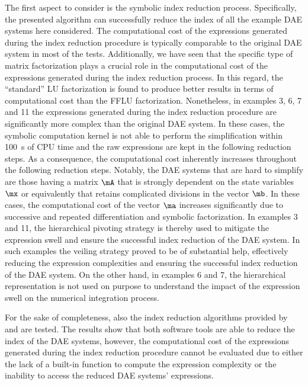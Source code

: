 The first aspect to consider is the symbolic index reduction process. Specifically, the presented algorithm can successfully reduce the index of all the example \ac{DAE} systems here considered. The computational cost of the expressions generated during the index reduction procedure is typically comparable to the original \ac{DAE} system in most of the tests. Additionally, we have seen that the specific type of matrix factorization plays a crucial role in the computational cost of the expressions generated during the index reduction process. In this regard, the ``standard'' \ac{LU} factorization is found to produce better results in terms of computational cost than the \ac{FFLU} factorization. Nonetheless, in examples 3, 6, 7 and 11 the expressions generated during the index reduction procedure are significantly more complex than the original \ac{DAE} system. In these cases, the \Maple{} symbolic computation kernel is not able to perform the simplification within \SI{100}{\second} of \ac{CPU} time and the raw expressions are kept in the following reduction steps. As a consequence, the computational cost inherently increases throughout the following reduction steps. Notably, the \ac{DAE} systems that are hard to simplify are those having a matrix $\mA$ that is strongly dependent on the state variables $\mx$ or equivalently that retains complicated divisions in the vector $\mb$. In these cases, the computational cost of the vector $\ma$ increases significantly due to successive and repeated differentiation and symbolic factorization. In examples 3 and 11, the hierarchical pivoting strategy is thereby used to mitigate the expression swell and ensure the successful index reduction of the \ac{DAE} system. In such examples the veiling strategy proved to be of substantial help, effectively reducing the expression complexities and ensuring the successful index reduction of the \ac{DAE} system. On the other hand, in examples 6 and 7, the hierarchical representation is not used on purpose to understand the impact of the expression swell on the numerical integration process.

For the sake of completeness, also the index reduction algorithms provided by \Matlab{} and \Mathematica{} are tested. The results show that both software tools are able to reduce the index of the \ac{DAE} systems, however, the computational cost of the expressions generated during the index reduction procedure cannot be evaluated due to either the lack of a built-in function to compute the expression complexity or the inability to access the reduced \ac{DAE} systems' expressions.

